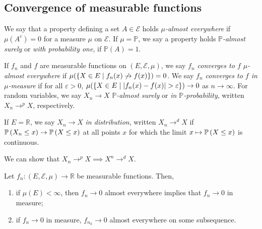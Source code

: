 \subsection{Convergence of measurable functions}
\begin{definition}
	We say that a property defining a set \( A \in \mathcal E \) holds \emph{\( \mu \)-almost everywhere} if \( \mu(A^c) = 0 \) for a measure \( \mu \) on \( \mathcal E \).
	If \( \mu = \mathbb P \), we say a property holds \emph{\( \mathbb P \)-almost surely} or \emph{with probability one}, if \( \mathbb P(A) = 1 \).

	If \( f_n \) and \( f \) are measurable functions on \( (E,\mathcal E,\mu) \), we say \emph{\( f_n \) converges to \( f \) \( \mu \)-almost everywhere} if \( \mu(\qty{X \in E \mid f_n(x) \not\to f(x)}) = 0 \).
	We say \emph{\( f_n \) converges to \( f \) in \( \mu \)-measure} if for all \( \varepsilon > 0 \), \( \mu(\qty{X \in E \mid \abs{f_n(x) - f(x)} > \varepsilon}) \to 0 \) as \( n \to \infty \).
	For random variables, we say \( X_n \to X \) \emph{\( \mathbb P \)-almost surely} or \emph{in \( \mathbb P \)-probability}, written \( X_n \to^p X \), respectively.

	If \( E = \mathbb R \), we say \( X_n \to X \) \emph{in distribution}, written \( X_n \to^d X \) if \( \mathbb{P}\left({X_n \leq x}\right) \to \mathbb{P}\left({X \leq x}\right) \) at all points \( x \) for which the limit \( x \mapsto \mathbb{P}\left({X \leq x}\right) \) is continuous.
\end{definition}
We can show that \( X_n \to^p X \implies X^n \to^d X \).
\begin{theorem}
	Let \( f_n \colon (E,\mathcal E,\mu) \to \mathbb R \) be measurable functions.
	Then,
	\begin{enumerate}
		\item if \( \mu(E) < \infty \), then \( f_n \to 0 \) almost everywhere implies that \( f_n \to 0 \) in measure;
		\item if \( f_n \to 0 \) in measure, \( f_{n_k} \to 0 \) almost everywhere on some subsequence.
	\end{enumerate}
\end{theorem}
